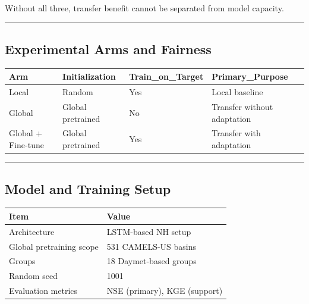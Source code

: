 \documentclass[
  letterpaper,
  DIV=11,
  numbers=noendperiod]{scrartcl}
\newcounter{none} %
\begin{document}
Without all three, transfer benefit cannot be separated from model
capacity.

\begin{center}\rule{0.5\linewidth}{0.5pt}\end{center}

\subsection{Experimental Arms and
Fairness}\label{experimental-arms-and-fairness}

{\def\LTcaptype{none} %
\begin{longtable}[]{@{}
  >{\raggedright\arraybackslash}p{}
  >{\raggedright\arraybackslash}p{}
  >{\centering\arraybackslash}p{}
  >{\raggedright\arraybackslash}p{}@{}}
\toprule\noalign{}
\begin{minipage}[b]{\linewidth}\raggedright
Arm
\end{minipage} & \begin{minipage}[b]{\linewidth}\raggedright
Initialization
\end{minipage} & \begin{minipage}[b]{\linewidth}\centering
Train\_on\_Target
\end{minipage} & \begin{minipage}[b]{\linewidth}\raggedright
Primary\_Purpose
\end{minipage} \\
\midrule\noalign{}
\endhead
\bottomrule\noalign{}
\endlastfoot
Local & Random & Yes & Local baseline \\
Global & Global pretrained & No & Transfer without adaptation \\
Global + Fine-tune & Global pretrained & Yes & Transfer with
adaptation \\
\end{longtable}
}

\begin{center}\rule{0.5\linewidth}{0.5pt}\end{center}

\subsection{Model and Training Setup}\label{model-and-training-setup}

{\def\LTcaptype{none} %
\begin{longtable}[]{@{}ll@{}}
\toprule\noalign{}
Item & Value \\
\midrule\noalign{}
\endhead
\bottomrule\noalign{}
\endlastfoot
Architecture & LSTM-based NH setup \\
Global pretraining scope & 531 CAMELS-US basins \\
Groups & 18 Daymet-based groups \\
Random seed & 1001 \\
Evaluation metrics & NSE (primary), KGE (support) \\
\end{longtable}
}
\end{document}
